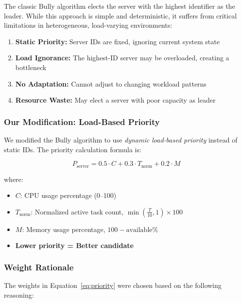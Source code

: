 \documentclass[12pt,a4paper]{article}
\begin{document}
The classic Bully algorithm \cite{garcia1982elections} elects the server with the highest identifier as the leader. While this approach is simple and deterministic, it suffers from critical limitations in heterogeneous, load-varying environments:

\begin{enumerate}[leftmargin=*]
    \item \textbf{Static Priority:} Server IDs are fixed, ignoring current system state
    \item \textbf{Load Ignorance:} The highest-ID server may be overloaded, creating a bottleneck
    \item \textbf{No Adaptation:} Cannot adjust to changing workload patterns
    \item \textbf{Resource Waste:} May elect a server with poor capacity as leader
\end{enumerate}

\subsubsection{Our Modification: Load-Based Priority}

We modified the Bully algorithm to use \emph{dynamic load-based priority} instead of static IDs. The priority calculation formula is:

\begin{equation}
\label{eq:priority}
P_{\text{server}} = 0.5 \cdot C + 0.3 \cdot T_{\text{norm}} + 0.2 \cdot M
\end{equation}

where:
\begin{itemize}
    \item $C$: CPU usage percentage (0--100)
    \item $T_{\text{norm}}$: Normalized active task count, $\min\left(\frac{T}{10}, 1\right) \times 100$
    \item $M$: Memory usage percentage, $100 - \text{available\%}$
    \item \textbf{Lower priority = Better candidate}
\end{itemize}

\subsubsection{Weight Rationale}

The weights in Equation~\ref{eq:priority} were chosen based on the following reasoning:
\end{document}
